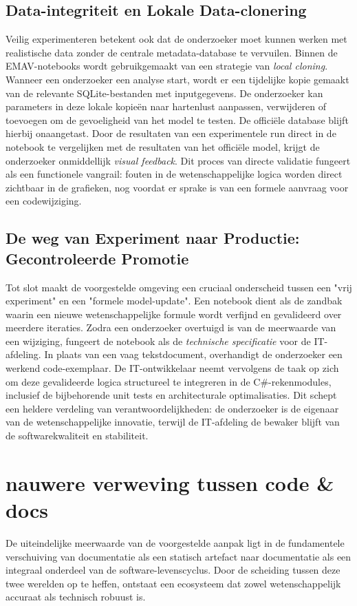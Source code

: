 \section{Data-integriteit en Lokale Data-clonering}
Veilig experimenteren betekent ook dat de onderzoeker moet kunnen werken met realistische data zonder de centrale metadata-database te vervuilen. Binnen de EMAV-notebooks wordt gebruikgemaakt van een strategie van \textit{local cloning}.
Wanneer een onderzoeker een analyse start, wordt er een tijdelijke kopie gemaakt van de relevante SQLite-bestanden met inputgegevens. De onderzoeker kan parameters in deze lokale kopieën naar hartenlust aanpassen, verwijderen of toevoegen om de gevoeligheid van het model te testen. De officiële database blijft hierbij onaangetast. Door de resultaten van een experimentele run direct in de notebook te vergelijken met de resultaten van het officiële model, krijgt de onderzoeker onmiddellijk \textit{visual feedback}. Dit proces van directe validatie fungeert als een functionele vangrail: fouten in de wetenschappelijke logica worden direct zichtbaar in de grafieken, nog voordat er sprake is van een formele aanvraag voor een codewijziging.
\section{De weg van Experiment naar Productie: Gecontroleerde Promotie}
Tot slot maakt de voorgestelde omgeving een cruciaal onderscheid tussen een "vrij experiment" en een "formele model-update". Een notebook dient als de zandbak waarin een nieuwe wetenschappelijke formule wordt verfijnd en gevalideerd over meerdere iteraties.
Zodra een onderzoeker overtuigd is van de meerwaarde van een wijziging, fungeert de notebook als de \textit{technische specificatie} voor de IT-afdeling. In plaats van een vaag tekstdocument, overhandigt de onderzoeker een werkend code-exemplaar. De IT-ontwikkelaar neemt vervolgens de taak op zich om deze gevalideerde logica structureel te integreren in de C\#-rekenmodules, inclusief de bijbehorende unit tests en architecturale optimalisaties. Dit schept een heldere verdeling van verantwoordelijkheden: de onderzoeker is de eigenaar van de wetenschappelijke innovatie, terwijl de IT-afdeling de bewaker blijft van de softwarekwaliteit en stabiliteit.
\chapter{nauwere verweving tussen code \& docs}
De uiteindelijke meerwaarde van de voorgestelde aanpak ligt in de fundamentele verschuiving van documentatie als een statisch artefact naar documentatie als een integraal onderdeel van de software-levenscyclus. Door de scheiding tussen deze twee werelden op te heffen, ontstaat een ecosysteem dat zowel wetenschappelijk accuraat als technisch robuust is.
